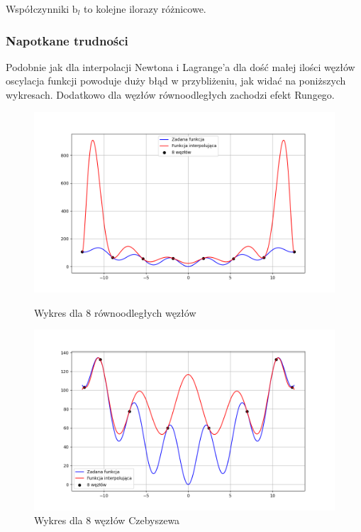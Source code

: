\documentclass{article}
\begin{document}
\indent

Współczynniki \(\mathrm{b}_{l}^{}\) to kolejne ilorazy różnicowe.

\subsubsection{Napotkane trudności}

Podobnie jak dla interpolacji Newtona i Lagrange'a dla dość małej ilości węzłów oscylacja funkcji powoduje duży błąd w przybliżeniu, jak widać na poniższych wykresach. Dodatkowo dla węzłów równoodległych zachodzi efekt Rungego.

\begin{figure}[H]
  \begin{minipage}[b]{0.49\textwidth}
    \includegraphics[width=\textwidth]{img14_n=8.png}
    \caption{Wykres dla 8 równoodległych węzłów}
  \end{minipage}
  \hfill
  \begin{minipage}[b]{0.49\textwidth}
    \includegraphics[width=\textwidth]{img15_n=8.png}
    \caption{Wykres dla 8 węzłów Czebyszewa}
  \end{minipage}
\end{figure}
\end{document}
